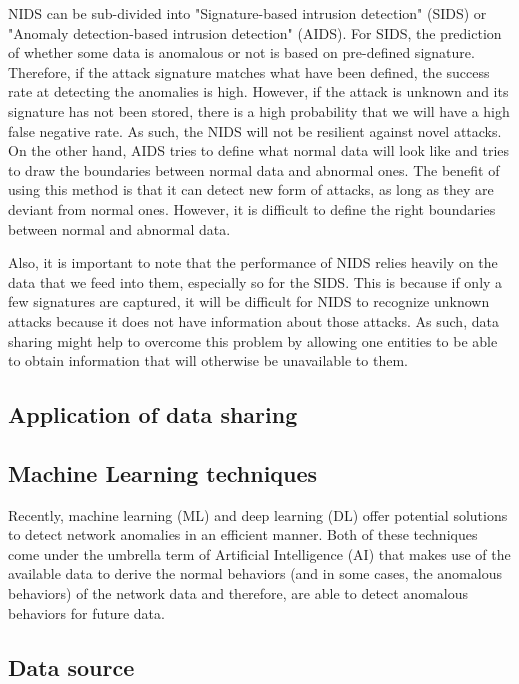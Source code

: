 \begin{background}
NIDS can be sub-divided into "Signature-based intrusion detection" (SIDS) or "Anomaly detection-based intrusion detection" (AIDS). For SIDS, the prediction of whether some data is anomalous or not is based on pre-defined signature. Therefore, if the attack signature matches what have been defined, the success rate at detecting the anomalies is high. However, if the attack is unknown and its signature has not been stored, there is a high probability that we will have a high false negative rate. As such, the NIDS will not be resilient against novel attacks. On the other hand, AIDS tries to define what normal data will look like and tries to draw the boundaries between normal data and abnormal ones. The benefit of using this method is that it can detect new form of attacks, as long as they are deviant from normal ones. However, it is difficult to define the right boundaries between normal and abnormal data.

Also, it is important to note that the performance of NIDS relies heavily on the data that we feed into them, especially so for the SIDS. This is because if only a few signatures are captured, it will be difficult for NIDS to recognize unknown attacks because it does not have information about those attacks. As such, data sharing might help to overcome this problem by allowing one entities to be able to obtain information that will otherwise be unavailable to them.


\subsection{Application of data sharing}



\subsection{Machine Learning techniques} 
Recently, machine learning (ML) and deep learning (DL) offer potential solutions to detect network anomalies in an efficient manner. Both of these techniques come under the umbrella term of Artificial Intelligence (AI) that makes use of the available data to derive the normal behaviors (and in some cases, the anomalous behaviors) of the network data and therefore, are able to detect anomalous behaviors for future data. 

\subsection{Data source}
\\
\\


\end{background}
